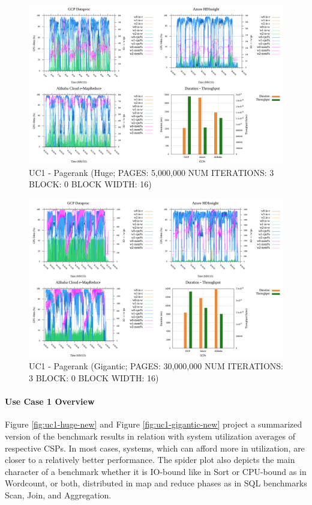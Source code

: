 \documentclass[review]{elsarticle}
\begin{document}
\begin{figure}[p]
	\caption{UC1 - Pagerank (Huge; PAGES: 5,000,000 NUM ITERATIONS: 3 BLOCK: 0 BLOCK WIDTH: 16)}
	\label{fig:uc1-page-h-cmidt}
	\includegraphics[width=\textwidth]{uc1-page-h-cmidt}
	\centering
\end{figure}

\begin{figure}[p]
	\caption{UC1 - Pagerank (Gigantic; PAGES: 30,000,000 NUM ITERATIONS: 3 BLOCK: 0 BLOCK WIDTH: 16)}
	\label{fig:uc1-page-g-cmidt}
	\includegraphics[width=\textwidth]{uc1-page-g-cmidt}
	\centering
\end{figure}


\paragraph{Use Case 1 Overview}Figure \ref{fig:uc1-huge-new} and Figure  \ref{fig:uc1-gigantic-new} project a summarized version of the benchmark results in relation with system utilization averages of respective CSPs. In most cases, systems, which can afford more in utilization, are closer to a relatively better performance. The spider plot also depicts the main character of a benchmark whether it is IO-bound like in Sort or CPU-bound as in Wordcount, or both, distributed in map and reduce phases as in SQL benchmarks Scan, Join, and Aggregation. 
\end{document}
